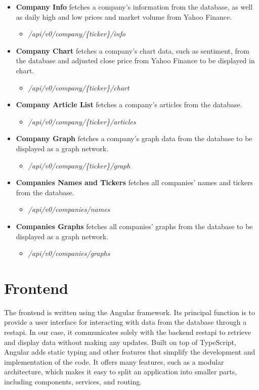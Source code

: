\begin{itemize}
    \item \textbf{Company Info} fetches a company's information from the database, as well as daily high and low prices and market volume from Yahoo Finance.
        \begin{itemize}
            \item \textit{/api/v0/company/\{ticker\}/info}
        \end{itemize}
    \item \textbf{Company Chart} fetches a company's chart data, such as sentiment, from the database and adjusted close price from Yahoo Finance to be displayed in chart.
        \begin{itemize}
            \item \textit{/api/v0/company/\{ticker\}/chart}
        \end{itemize}
    \item \textbf{Company Article List} fetches a company's articles from the database.
        \begin{itemize}
            \item \textit{/api/v0/company/\{ticker\}/articles}
        \end{itemize}
    \item \textbf{Company Graph} fetches a company's graph data from the database to be displayed as a graph network.
        \begin{itemize}
            \item \textit{/api/v0/company/\{ticker\}/graph}
        \end{itemize}
    \item \textbf{Companies Names and Tickers} fetches all companies' names and tickers from the database.
        \begin{itemize}
            \item \textit{/api/v0/companies/names}
        \end{itemize}
    \item \textbf{Companies Graphs} fetches all companies' graphs from the database to be displayed as a graph network.
        \begin{itemize}
            \item \textit{/api/v0/companies/graphs}
        \end{itemize}
\end{itemize}

\section{Frontend}
\label{sec:frontend}
The frontend is written using the Angular framework. Its principal function is to provide a user interface for interacting with data from the database through a \acrshort{restapi}. In our case, it communicates solely with the backend \acrshort{restapi} to retrieve and display data without making any updates. Built on top of TypeScript, Angular adds static typing and other features that simplify the development and implementation of the code. It offers many features, such as a modular architecture, which makes it easy to split an application into smaller parts, including components, services, and routing.

